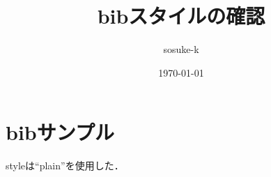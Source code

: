 \documentclass{article}
\title{bibスタイルの確認}
\author{sosuke-k}
\date{\today}
\begin{document}

\section*{bibサンプル}

styleは``plain''を使用した\cite{sample:article,sample:inproceedings,sample:inbook}．





\end{document}

